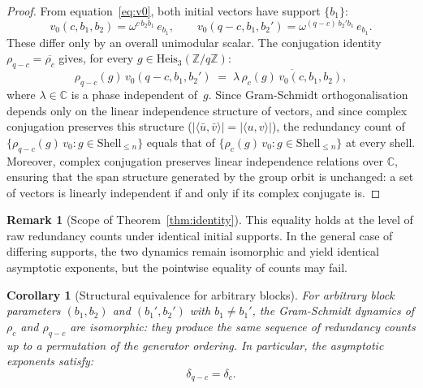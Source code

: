 \documentclass[11pt,a4paper]{article}
\newtheorem{corollary}[theorem]{Corollary}
\theoremstyle{definition}
\newtheorem{remark}[theorem]{Remark}
\newcommand{\Heis}{\mathrm{Heis}_3}
\newcommand{\ZqZ}{\mathbb{Z}/q\mathbb{Z}}
\begin{document}
      \begin{proof}
        From equation~\eqref{eq:v0}, both initial vectors have support $\{b_1\}$:
        \[
          v_0(c,b_1,b_2) = \omega^{c\,b_2 b_1}\,e_{b_1},
          \qquad
          v_0(q-c,b_1,b_2') = \omega^{(q-c)\,b_2' b_1}\,e_{b_1}.
        \]
        These differ only by an overall unimodular scalar.
        The conjugation identity $\rho_{q-c} = \overline{\rho_c}$ gives,
        for every $g \in \Heis(\ZqZ)$:
        \[
          \rho_{q-c}(g)\,v_0(q-c,b_1,b_2')
          \;=\; \lambda\,\overline{\rho_c(g)\,v_0(c,b_1,b_2)},
        \]
        where $\lambda \in \mathbb{C}$ is a phase independent of~$g$.
        Since Gram-Schmidt orthogonalisation depends only on the
        linear independence structure of vectors, and since complex
        conjugation preserves this structure
        ($|\langle \bar u, \bar v \rangle| = |\langle u, v \rangle|$),
        the redundancy count of
        $\{\rho_{q-c}(g)\,v_0 : g \in \mathrm{Shell}_{\leq n}\}$
        equals that of
        $\{\rho_c(g)\,v_0 : g \in \mathrm{Shell}_{\leq n}\}$
        at every shell.
        Moreover, complex conjugation preserves linear independence relations
        over $\mathbb{C}$, ensuring that the span structure generated by the
        group orbit is unchanged: a set of vectors is linearly independent
        if and only if its complex conjugate is.
      \end{proof}

      \begin{remark}[Scope of Theorem~\ref{thm:identity}]
        \label{rem:scope}
        This equality holds at the level of raw redundancy counts under
        identical initial supports.
        In the general case of differing supports, the two dynamics remain
        isomorphic and yield identical asymptotic exponents, but the
        pointwise equality of counts may fail.
      \end{remark}

      \begin{corollary}[Structural equivalence for arbitrary blocks]
        \label{cor:structural_equiv}
        For arbitrary block parameters $(b_1, b_2)$ and $(b_1', b_2')$
        with $b_1 \neq b_1'$, the Gram-Schmidt dynamics of $\rho_c$ and
        $\rho_{q-c}$ are isomorphic: they produce the same sequence of
        redundancy counts up to a permutation of the generator ordering.
        In particular, the asymptotic exponents satisfy:
        \[
          \delta_{q-c} = \delta_c.
        \]
      \end{corollary}
\end{document}
